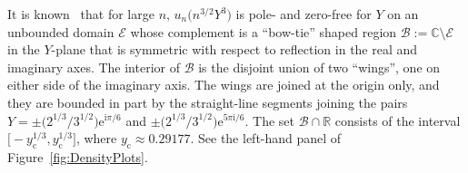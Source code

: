 \documentclass[pdftex]{sigma}
\numberwithin{equation}{section}
\begin{document}
It is known~\cite[Theorem 3]{BuckinghamM22} that for large $n$, $u_n\bigl(n^{3/2}Y^3\bigr)$ is pole- and zero-free for $Y$ on an unbounded domain $\mathcal{E}$ whose complement is a ``bow-tie'' shaped region $\mathcal{B}:=\mathbb{C}\setminus\mathcal{E}$ in the $Y$-plane that is symmetric with respect to reflection in the real and imaginary axes. The interior of $\mathcal{B}$ is the disjoint union of two ``wings'', one on either side of the imaginary axis. The wings are joined at the origin only, and they are bounded in part by the straight-line segments joining the pairs $Y=\pm \bigl(2^{1/3}/3^{1/2}\bigr)\mathrm{e}^{\mathrm{i}\pi/6}$ and $\pm \bigl(2^{1/3}/3^{1/2}\bigr)\mathrm{e}^{5\pi\mathrm{i}/6}$. The set $\mathcal{B}\cap\mathbb{R}$ consists of the interval $\bigl[-y_\mathrm{c}^{1/3},y_\mathrm{c}^{1/3}\bigr]$, where $y_\mathrm{c}\approx 0.29177$. See the left-hand panel of Figure~\ref{fig:DensityPlots}.
\end{document}

